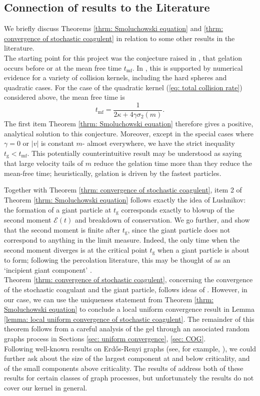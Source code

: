 \subsection{Connection of results to the Literature}
We briefly discuss Theorems \ref{thrm: Smoluchowski equation} and \ref{thrm: convergence of stochastic coagulent} in relation to some other results in the literature. \medskip \\ The starting point for this project was the conjecture raised in \cite{PSW16}, that gelation occurs before or at the mean free time $t_\mathrm{mf}$. In \cite{PSW16}, this is supported by numerical evidence for a variety of collision kernels, including the hard spheres and quadratic cases. For the case of the quadratic kernel (\ref{eq: total collision rate}) considered above, the mean free time is \begin{equation} t_\mathrm{mf}=\frac{1}{2\kappa+4\gamma\sigma_2(m)}. \end{equation} The first item Theorem \ref{thrm: Smoluchowski equation} therefore gives a positive, analytical solution to this conjecture. Moreover, except in the special cases where $\gamma=0$ or $|v|$ is constant $m$- almost everywhere, we have the strict inequality $t_\mathrm{g}<t_\mathrm{mf}$. This potentially counterintuitive result may be understood as saying that large velocity tails of $m$ reduce the gelation time more than they reduce the mean-free time; heuristically, gelation is driven by the fastest particles.

Together with Theorem \ref{thrm: convergence of stochastic coagulent}, item 2 of Theorem \ref{thrm: Smoluchowski equation} follows exactly the idea of Lushnikov: the formation of a giant particle at $t_\mathrm{g}$ corresponds exactly to blowup of the second moment $\mathcal{E}(t)$ and breakdown of conservation. We go further, and show that the second moment is finite after $t_\mathrm{g}$, since the giant particle does not correspond to anything in the limit measure. Indeed, the only time when the second moment diverges is at the critical point $t_\mathrm{g}$ when a giant particle is about to form; following the percolation literature, this may be thought of as an `incipient giant component' \cite{Ald16}. \medskip \\ Theorem \ref{thrm: convergence of stochastic coagulent}, concerning the convergence of the stochastic coagulant and the giant particle, follows ideas of \cite[Theorem 4.1]{N00}. However, in our case, we can use the uniqueness statement from Theorem \ref{thrm: Smoluchowski equation} to conclude a local uniform convergence result in Lemma \ref{lemma: local uniform convergence of stochastic coagulent}. The remainder of this theorem follows from a careful analysis of the gel through an associated random graphs process in Sections \ref{sec: uniform convergence}, \ref{sec: COG}. \medskip \\ Following well-known results on Erd\H{o}s-Renyi graphs (see, for example, \cite{B01}), we could further ask about the size of the largest component at and below criticality, and of the small components above criticality.  The results of \cite{BJR07} address both of these results for certain classes of graph processes, but unfortunately the results do not cover our kernel in general.   
